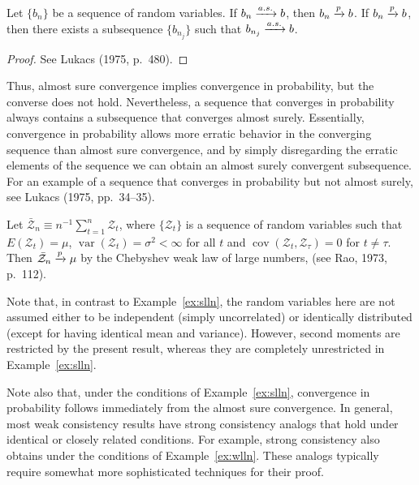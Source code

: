 \begin{theorem}\label{thm:as-implies-p}
Let $\{b_n\}$ be a sequence of random variables. If $b_n \xrightarrow{a.s.} b$,
then $b_n \xrightarrow{p} b$. If $b_n \xrightarrow{p} b$, then there exists a subsequence $\{b_{n_j}\}$ such that
$b_{n_j} \xrightarrow{a.s.} b$.
\end{theorem}

\begin{proof}
See Lukacs (1975, p.\ 480).
\end{proof}

Thus, almost sure convergence implies convergence in probability, but the
converse does not hold. Nevertheless, a sequence that converges in probability always contains a subsequence that converges almost surely. Essentially,
convergence in probability allows more erratic behavior in the converging
sequence than almost sure convergence, and by simply disregarding the erratic elements of the sequence we can obtain an almost surely convergent
subsequence. For an example of a sequence that converges in probability
but not almost surely, see Lukacs (1975, pp.~34--35).

\begin{example}\label{ex:wlln}
Let $\bar{\mathcal{Z}}_n \equiv n^{-1}\sum_{t=1}^n \mathcal{Z}_t$, where $\{\mathcal{Z}_t\}$ is a sequence of random variables such that $E(\mathcal{Z}_t) = \mu$, $\operatorname{var}(\mathcal{Z}_t) = \sigma^2 < \infty$ for all $t$ and
$\operatorname{cov}(\mathcal{Z}_t, \mathcal{Z}_{\tau}) = 0$ for $t \neq \tau$. Then $\bar{\mathcal{Z}}_n \xrightarrow{p} \mu$ by the Chebyshev weak law of
large numbers, (see Rao, 1973, p.~112).
\end{example}

Note that, in contrast to Example~\ref{ex:slln}, the random variables here are not
assumed either to be independent (simply uncorrelated) or identically distributed (except for having identical mean and variance). However, second
moments are restricted by the present result, whereas they are completely
unrestricted in Example~\ref{ex:slln}.

Note also that, under the conditions of Example~\ref{ex:slln}, convergence in
probability follows immediately from the almost sure convergence. In general, most weak consistency results have strong consistency analogs that
hold under identical or closely related conditions. For example, strong consistency also obtains under the conditions of Example~\ref{ex:wlln}. These analogs
typically require somewhat more sophisticated techniques for their proof.


